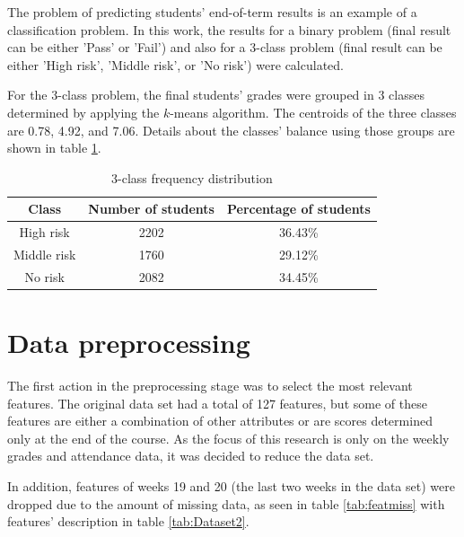 The problem of predicting students' end-of-term results is an example of a classification problem. In this work, the results for a binary problem (final result can be either 'Pass' or 'Fail') and also for a 3-class problem (final result can be either 'High risk', 'Middle risk', or 'No risk') were calculated.

For the 3-class problem, the final students' grades were grouped in 3 classes determined by applying the $k$-means algorithm. The centroids of the three classes are 0.78, 4.92, and 7.06. Details about the classes' balance using those groups are shown in table \ref{tab:3c}.

\begin{table}[htb]
\centering
\begin{tabular}{ccc} \hline
\textbf{Class} & \textbf{Number of students} & \textbf{Percentage of students} \\ \hline
High risk                & 2202                        & 36.43\%               \\
Middle risk              & 1760                        & 29.12\%               \\
No risk                  & 2082                        & 34.45\%               \\ \hline
\end{tabular}
\caption{3-class frequency distribution}
\label{tab:3c}
\end{table}

\section{Data preprocessing}
The first action in the preprocessing stage was to select the most relevant features. The original data set had a total of 127 features, but some of these features are either a combination of other attributes or are scores determined only at the end of the course. As the focus of this research is only on the weekly grades and attendance data, it was decided to reduce the data set.

In addition, features of weeks 19 and 20 (the last two weeks in the data set) were dropped due to the amount of missing data, as seen in table \ref{tab:featmiss} with features' description in table \ref{tab:Dataset2}. 

